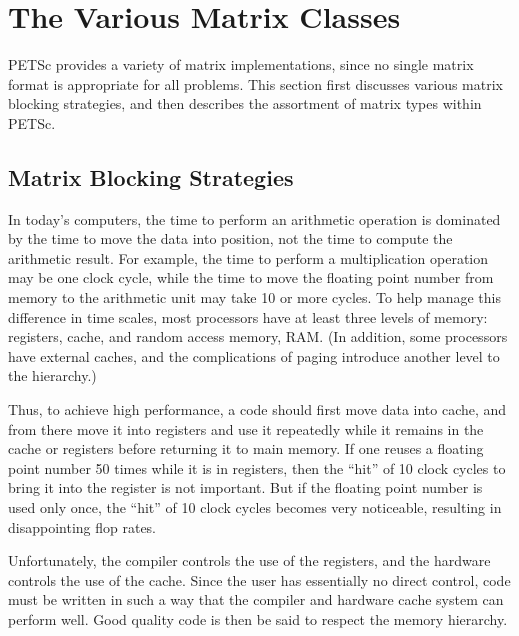 
\chapter{The Various Matrix Classes}
\label{sec:matclasses}

PETSc provides a variety of matrix implementations, since no single
matrix format is appropriate for all problems.  This section first
discusses various matrix blocking strategies, and then
describes the assortment of matrix types within PETSc.

\section{Matrix Blocking Strategies}

In today's computers, the time to perform an arithmetic operation is
dominated by the time to move the data into position, not the time to
compute the arithmetic result.  For example, the time to perform a
multiplication operation may be one clock cycle, while the time to
move the floating point number from memory to the arithmetic unit may
take 10 or more cycles. To help manage this difference in time scales,
most processors have at least three levels of memory: registers,
cache, and random access memory, RAM. (In addition, some processors
have external caches, and the complications of paging introduce
another level to the hierarchy.)

Thus, to achieve high performance, a code should first move data into
cache, and from there move it into registers and use it repeatedly
while it remains in the cache or registers before returning it to main
memory. If one reuses a floating point number 50 times while it is in
registers, then the ``hit'' of 10 clock cycles to bring it into the
register is not important. But if the floating point number is used
only once, the ``hit'' of 10 clock cycles becomes very noticeable,
resulting in disappointing flop rates.

Unfortunately, the compiler controls the use of the registers, and the
hardware controls the use of the cache. Since the user has essentially
no direct control, code must be written in such a way that the
compiler and hardware cache system can perform well. Good quality code
is then be said to respect the memory hierarchy.

